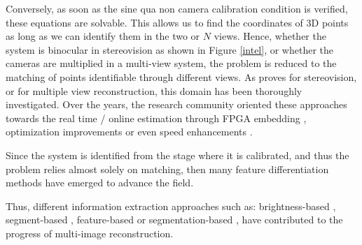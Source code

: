 Conversely, as soon as the sine qua non camera calibration condition is verified, these equations are solvable. This allows us to find the coordinates of 3D points as long as we can identify them in the two or $N$ views. Hence, whether the system is binocular in stereovision as shown in Figure \ref{intel}, or whether the cameras are multiplied in a multi-view system, the problem is reduced to the matching of points identifiable through different views.
As proves \cite{bensrhair1996fast,banks2001quantitative,scharstein2002taxonomy,gehrig2009real} for stereovision, or \cite{hartley1994projective,hartley2000zisserman,campbell2008using} for multiple view reconstruction, this domain has been thoroughly investigated.
Over the years, the research community oriented these approaches towards the real time / online estimation through FPGA embedding \cite{banz2010real}, optimization improvements \cite{kolmogorov2002multi, michael2013real,rodriguez2017improve} or even speed enhancements \cite{feng2019asv}.

Since the system is identified from the stage where it is calibrated, and thus the problem relies almost solely on matching, then many feature differentiation methods have emerged to advance the field.


Thus, different information extraction approaches such as: brightness-based \cite{gennert1988brightness}, segment-based \cite{sumi20023d}, feature-based \cite{se2001vision} or segmentation-based \cite{bleyer2004layered}, have contributed to the progress of multi-image reconstruction.

